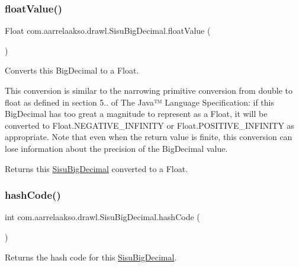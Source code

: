 \subsubsection{\texorpdfstring{float\+Value()}{floatValue()}}
{\footnotesize\ttfamily Float com.\+aarrelaakso.\+drawl.\+Sisu\+Big\+Decimal.\+float\+Value (\begin{DoxyParamCaption}{ }\end{DoxyParamCaption})\hspace{0.3cm}{\ttfamily [protected]}}



Converts this Big\+Decimal to a Float. 

This conversion is similar to the narrowing primitive conversion from double to float as defined in section 5.. of The Java™ Language Specification\+: if this Big\+Decimal has too great a magnitude to represent as a Float, it will be converted to Float.\+N\+E\+G\+A\+T\+I\+V\+E\+\_\+\+I\+N\+F\+I\+N\+I\+TY or Float.\+P\+O\+S\+I\+T\+I\+V\+E\+\_\+\+I\+N\+F\+I\+N\+I\+TY as appropriate. Note that even when the return value is finite, this conversion can lose information about the precision of the Big\+Decimal value.

\begin{DoxyReturn}{Returns}
this \hyperlink{classcom_1_1aarrelaakso_1_1drawl_1_1_sisu_big_decimal}{Sisu\+Big\+Decimal} converted to a Float. 
\end{DoxyReturn}
\mbox{\label{classcom_1_1aarrelaakso_1_1drawl_1_1_sisu_big_decimal_a34555e12897a07cb48ac84a5b95f320a}} 
\subsubsection{\texorpdfstring{hash\+Code()}{hashCode()}}
{\footnotesize\ttfamily int com.\+aarrelaakso.\+drawl.\+Sisu\+Big\+Decimal.\+hash\+Code (\begin{DoxyParamCaption}{ }\end{DoxyParamCaption})}



Returns the hash code for this \hyperlink{classcom_1_1aarrelaakso_1_1drawl_1_1_sisu_big_decimal}{Sisu\+Big\+Decimal}. 

